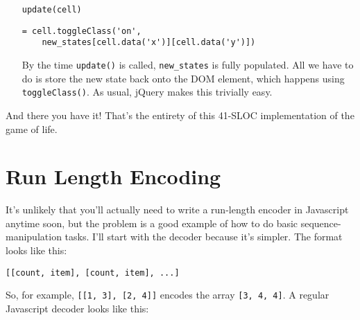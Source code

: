 \documentclass{report}
\begin{document}
\begin{enumerate}
  This is an array like {\tt cs} that contains the new state of each cell. We have to store these before updating the individual cell elements because otherwise we would lose
  information; future computations depend on the old state of each cell.

  My API is a bit suboptimal for this case.\footnote{Actually, a lot of the factoring here is suboptimal. But I'm resisting my OCD and leaving it this way for now.} I end up throwing
  away the actual elements of {\tt cs} and just using their indexes as positional coordinates. The first map preserves sequence context for its block to make the inner map more
  convenient. I rename the inner variable to have access to both {\tt xi} and {\tt yi} at the same time.

  {\tt new\_states} is a variable, so its value is computed eagerly after the functions above it have been created. However, it has no access to {\tt update}, which is defined below.

\item[{\tt update(cell)}]
\begin{verbatim}
= cell.toggleClass('on',
    new_states[cell.data('x')][cell.data('y')])
\end{verbatim}

  By the time {\tt update()} is called, {\tt new\_states} is fully populated. All we have to do is store the new state back onto the DOM element, which happens using {\tt
  toggleClass()}. As usual, jQuery makes this trivially easy.
\end{enumerate}

      And there you have it! That's the entirety of this 41-SLOC implementation of the game of life.

\chapter{Run Length Encoding}
  It's unlikely that you'll actually need to write a run-length encoder in Javascript anytime soon, but the problem is a good example of how to do basic sequence-manipulation tasks. I'll start
  with the decoder because it's simpler. The format looks like this:

\begin{verbatim}
[[count, item], [count, item], ...]
\end{verbatim}

  \noindent So, for example, \verb+[[1, 3], [2, 4]]+ encodes the array \verb+[3, 4, 4]+. A regular Javascript decoder looks like this:
\end{document}
